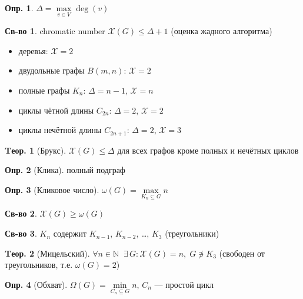 \documentclass[a4paper,12pt]{article}
\numberwithin{figure}{section}
\theoremstyle{definition}
\newtheorem{definition}{Опр.}[section]
\newtheorem*{property}{Св-во}  %
\theoremstyle{definition}
\newtheorem{theorem}{Tеор.}[section]
\def\iiChi{\mathcal{X}}
\begin{document}
\begin{definition} $\Delta = \max \limits_{v \in V} \deg(v)$ \end{definition}

\begin{property}
	chromatic number $\iiChi(G) \leqslant \Delta + 1$ (оценка жадного алгоритма)
\end{property}

\begin{itemize}
  \item  деревья:  $\iiChi=2$
  \item  двудольные графы $B(m,n)$: $\iiChi=2$
  \item  полные графы $K_n$:        $\Delta=n-1$, $\iiChi=n$
  \item  циклы чётной длины $C_{2n}$:     $\Delta=2$, $\iiChi=2$
  \item  циклы нечётной длины $C_{2n+1}$: $\Delta=2$, $\iiChi=3$
\end{itemize}

\begin{theorem}[Брукс]
	$\iiChi(G) \leqslant \Delta$ для всех графов кроме полных и нечётных циклов
\end{theorem}

\begin{definition}[Клика] полный подграф \end{definition}

\begin{definition}[Кликовое число]
	$ \omega(G) = \max \limits_{K_n \subseteq G} n $
\end{definition}

\begin{property} $ \iiChi(G) \geqslant \omega(G) $ \end{property}

\begin{property} $K_n$ содержит $K_{n-1}$, $K_{n-2}$, \dots, $K_3$ (треугольники) \end{property}

\begin{theorem}[Мицельский]
	$\forall n \in \mathbb{N} \;\; \exists \, G: \iiChi(G)=n, \; G \not\owns K_3$
	(свободен от треугольников, т.е. $\omega(G)=2$)
\end{theorem}

\begin{definition}[Обхват]
	$\Omega(G) = \min \limits_{C_n \subseteq G} n $, $C_n$ --- простой цикл
\end{definition}
\end{document}

